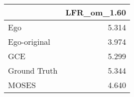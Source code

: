 \begin{tabular}{lr}
\toprule
{} & LFR_om_1.60 \\
\midrule
Ego          &       5.314 \\
Ego-original &       3.974 \\
GCE          &       5.299 \\
Ground Truth &       5.344 \\
MOSES        &       4.640 \\
\bottomrule
\end{tabular}
